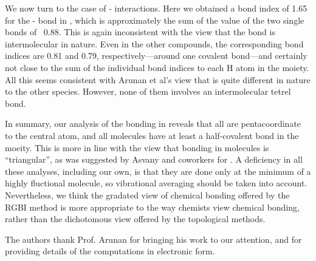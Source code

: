 \documentclass[journal=jpcafh,manuscript=letter]{achemso}
\begin{document}
We now turn to the case of - interactions.
Here we obtained a bond index of 1.65 for the - 
bond in , which is approximately the sum 
of the value of the two single  bonds of ~0.88. 
This is again inconsistent with the view that the
 bond is intermolecular in nature. 
Even in the other  compounds, the corresponding bond indices 
are 0.81 and 0.79, respectively---around one covalent 
bond---and certainly not close to the sum of the individual 
bond indices to each H atom in the  moiety. 
All this seems consistent with Arunan et al's view that  
is quite different in nature to the other species. However, 
none of them involves an intermolecular tetrel bond.

In summary, our analysis of the bonding in 
reveals that all are pentacoordinate to the central atom,
and all molecules have at least a half-covalent  
bond in the  moeity. This is more in line with 
the view that bonding  in  molecules is 
``triangular'', as was suggested by Asvany and 
coworkers\cite{Asvany1346} for . 
A deficiency in all these analyses, including our own, 
is that they are done only at the minimum of a highly 
fluctional molecule, so vibrational averaging should 
be taken into account. Nevertheless, we think the 
gradated view of chemical bonding offered by the 
RGBI method is more appropriate to the way chemists
view chemical bonding, rather than the dichotomous 
view offered by the topological methods.















\begin{acknowledgement}

The authors thank Prof. Arunan for bringing his work to our attention, and for providing details of the computations in electronic form.



\end{acknowledgement}


\end{document}
